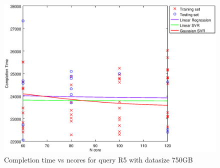 
\begin {figure}[hbtp]
\centering
\includegraphics[width=\textwidth]{output/R5_750_1_OVER_NCORES/plot_R5_750_bestmodels.eps}
\caption{Completion time vs ncores for query R5 with datasize 750GB}
\label{fig:all_nonlinear_R5_750}
\end {figure}
